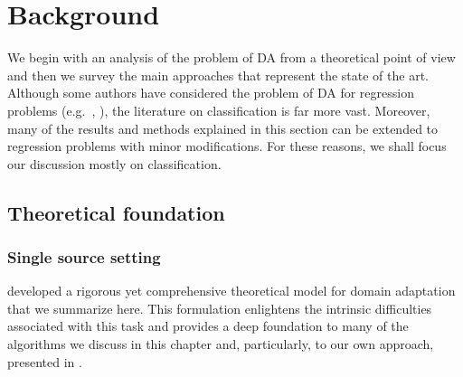 \section{Background}
\label{sec:chp3_background}
We begin with an analysis of the problem of DA from a theoretical point of view and then we survey the main approaches that represent the state of the art. Although some authors have considered the problem of DA for regression problems (e.g.\ \citet{Cortes2011}, \citet{Zhao2018}), the literature on classification is far more vast. Moreover, many of the results and methods explained in this section can be extended to regression problems with minor modifications. For these reasons, we shall focus our discussion mostly on classification.

\subsection{Theoretical foundation}
\label{sec:da_theory}

\subsubsection{Single source setting}
\label{sec:da_theory_ss}
\citet{BenDavid2010} developed a rigorous yet comprehensive theoretical model for domain adaptation that we summarize here. This formulation enlightens the intrinsic difficulties associated with this task and provides a deep foundation to many of the algorithms we discuss in this chapter and, particularly, to our own approach, presented in .

